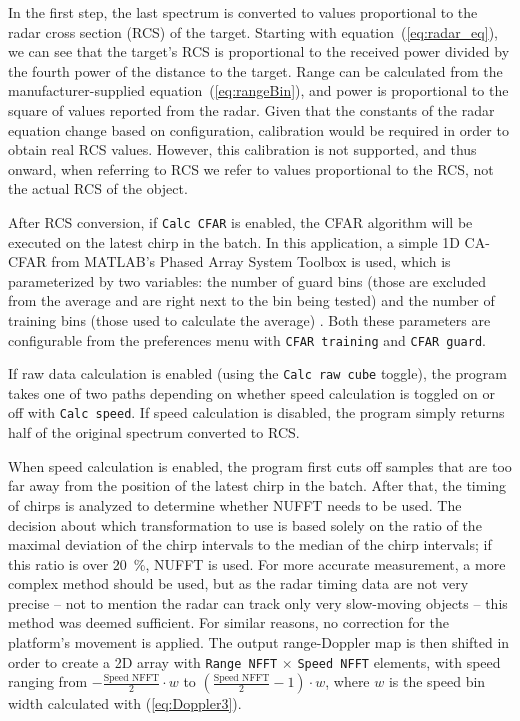 In the first step, the last spectrum is converted to values proportional to the radar cross section (RCS) of the target.
Starting with equation~(\ref{eq:radar_eq}), we can see that the target's RCS is proportional to the received power divided by the fourth power of the distance to the target.
Range can be calculated from the manufacturer-supplied equation~(\ref{eq:rangeBin}), and power is proportional to the square of values reported from the radar.
Given that the constants of the radar equation change based on configuration, calibration would be required in order to obtain real RCS values.
However, this calibration is not supported, and thus onward, when referring to RCS we refer to values proportional to the RCS, not the actual RCS of the object.

After RCS conversion, if \texttt{Calc CFAR} is enabled, the CFAR algorithm will be executed on the latest chirp in the batch.
In this application, a simple 1D CA-CFAR from MATLAB's Phased Array System Toolbox is used, which is parameterized by two variables: the number of guard bins (those are excluded from the average and are right next to the bin being tested) and the number of training bins (those used to calculate the average) \cite{matlab_cfar}.
Both these parameters are configurable from the preferences menu with \texttt{CFAR training} and \texttt{CFAR guard}.

If raw data calculation is enabled (using the \texttt{Calc raw cube} toggle), the program takes one of two paths depending on whether speed calculation is toggled on or off with \texttt{Calc speed}.
If speed calculation is disabled, the program simply returns half of the original spectrum converted to RCS.

When speed calculation is enabled, the program first cuts off samples that are too far away from the position of the latest chirp in the batch.
After that, the timing of chirps is analyzed to determine whether NUFFT needs to be used.
The decision about which transformation to use is based solely on the ratio of the maximal deviation of the chirp intervals to the median of the chirp intervals; if this ratio is over 20~\%, NUFFT is used.
For more accurate measurement, a more complex method should be used, but as the radar timing data are not very precise -- not to mention the radar can track only very slow-moving objects -- this method was deemed sufficient.
For similar reasons, no correction for the platform's movement is applied.
The output range-Doppler map is then shifted in order to create a 2D array with \texttt{Range NFFT} $\times$ \texttt{Speed NFFT} elements, with speed ranging from $-\frac{\text{Speed NFFT}}{2}\cdot w $ to  $\left(\frac{\text{Speed NFFT}}{2}-1\right)\cdot w $, where $w$ is the speed bin width calculated with (\ref{eq:Doppler3}).


